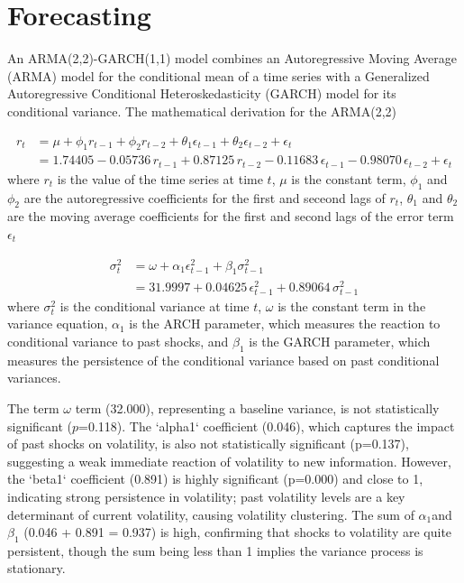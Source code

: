 \section{Forecasting}

An ARMA(2,2)-GARCH(1,1) model combines an Autoregressive Moving Average (ARMA) model for the conditional mean of a time series with a Generalized Autoregressive Conditional Heteroskedasticity (GARCH) model for its conditional variance. The mathematical derivation for the ARMA(2,2)

\begin{equation}
\begin{aligned}
	r_t &= \mu + \phi_1 r_{t-1} + \phi_2 r_{t-2} + \theta_1 \epsilon_{t-1} + \theta_2 \epsilon_{t-2} + \epsilon_t \\
	&= 1.74405 - 0.05736\, r_{t-1} + 0.87125\, r_{t-2} - 0.11683\, \epsilon_{t-1} - 0.98070\, \epsilon_{t-2} + \epsilon_t
\end{aligned}
\end{equation}
where $r_t$ is the value of the time series at time $t$, $\mu$ is the constant term, $\phi_1$ and $\phi_2$ are the autoregressive coefficients for the first and seceond lags of $r_t$, $\theta_1$ and $\theta_2$ are the moving average coefficients for the first and second lags of the error term $\epsilon_t$

\begin{equation}
	\begin{aligned}
		\sigma_t^2 &= \omega + \alpha_1 \epsilon_{t-1}^2 + \beta_1 \sigma_{t-1}^2 \\
		&= 31.9997 + 0.04625\, \epsilon_{t-1}^2 + 0.89064\, \sigma_{t-1}^2
	\end{aligned}
\end{equation}
where $\sigma_t^2$ is the conditional variance at time $t$, $\omega$ is the constant term in the variance equation, $\alpha_1$ is the ARCH parameter, which measures the reaction to conditional variance to past shocks, and $\beta_1$ is the GARCH parameter, which measures the persistence of the conditional variance based on past conditional variances. 

The term $\omega $ term (32.000), representing a baseline variance, is not statistically significant ($p$=0.118). The `alpha1` coefficient (0.046), which captures the impact of past shocks on volatility, is also not statistically significant (p=0.137), suggesting a weak immediate reaction of volatility to new information. However, the `beta1` coefficient (0.891) is highly significant (p=0.000) and close to 1, indicating strong persistence in volatility; past volatility levels are a key determinant of current volatility, causing volatility clustering. The sum of $\alpha_1 $and $\beta_1$ (0.046 + 0.891 = 0.937) is high, confirming that shocks to volatility are quite persistent, though the sum being less than 1 implies the variance process is stationary.

